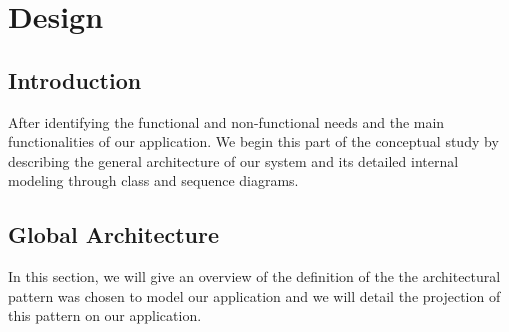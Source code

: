 \chapter{Design}
\section*{Introduction}
After identifying the functional and non-functional needs and the main functionalities of our application. We begin this part
of the conceptual study by describing the general architecture of our system and
its detailed internal modeling through class and sequence diagrams.
\section{Global Architecture}
In this section, we will give an overview of the definition of the
the architectural pattern was chosen to model our application and we will
detail the projection of this pattern on our application.
